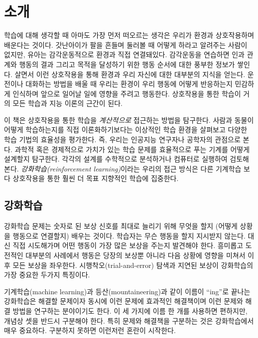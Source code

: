 

\chapter{소개}

학습에 대해 생각할 때 아마도 가장 먼저 떠오르는 생각은 우리가 환경과
상호작용하며 배운다는 것이다. 갓난아이가 팔을 흔들며 둘러볼 때 어떻게 하라고
알려주는 사람이 없지만, 유아는 감각운동적으로 환경과 직접 연결돼있다. 감각운동을
연습하면 인과 관계와 행동의 결과 그리고 목적을 달성하기 위한 행동 순서에 대한
풍부한 정보가 쌓인다. 살면서 이런 상호작용을 통해 환경과 우리 자신에 대한
대부분의 지식을 얻는다. 운전이나 대화하는 방법을 배울 때 우리는 환경이 우리
행동에 어떻게 반응하는지 민감하게 인식하며 앞으로 일어날 일에 영향을 주려고
행동한다. 상호작용을 통한 학습이 거의 모든 학습과 지능 이론의 근간이 된다.

이 책은 상호작용을 통한 학습을 \emph{계산적으로} 접근하는 방법을 탐구한다.
사람과 동물이 어떻게 학습하는지를 직접 이론화하기보다는 이상적인 학습 환경을
살펴보고 다양한 학습 기법의 효율성을 평가한다. 즉, 우리는 인공지능 연구자나
공학자의 관점으로 본다. 과학적 혹은 경제적으로 가치가 있는 학습 문제를
효율적으로 푸는 기계를 어떻게 설계할지 탐구한다. 각각의 설계를 수학적으로
분석하거나 컴퓨터로 실행하여 검토해본다.
\emph{강화학습(reinforcement learning)}이라는 우리의 접근 방식은 다른 기계학습
보다 상호작용을 통한 훨씬 더 목표 지향적인 학습에 집중한다.

\section{강화학습}

강화학습 문제는 숫자로 된 보상 신호를
최대로 늘리기 위해 무엇을 할지 (어떻게 상황을 행동으로 연결할지) 배우는 것이다.
학습자는
무슨 행동을 할지 지시받지 않는다. 대신 직접 시도해가며 어떤 행동이 가장 많은
보상을 주는지 발견해야 한다. 흥미롭고 도전적인 대부분의 사례에서 행동은 당장의
보상뿐 아니라 다음 상황에 영향을 미쳐서 이후 모든 보상을 좌우한다.
시행착오(trial-and-error) 탐색과 지연된 보상이 강화학습의 가장 중요한 두가지
특징이다.

기계학습(machine learning)과 등산(mountaineering)과 같이 이름이 ``ing''로 끝나는
강화학습은 해결할 문제이자 동시에 이런 문제에 효과적인 해결책이며 이런 문제와
해결 방법을 연구하는 분야이기도 한다. 이 세 가지에 이름 한 개를 사용하면
편하지만, 개념상 셋을 반드시 구분해야 한다. 특히 문제와 해결책을 구분하는 것은
강화학습에서 매우 중요하다. 구분하지 못하면 이런저런 혼란이 시작한다.

